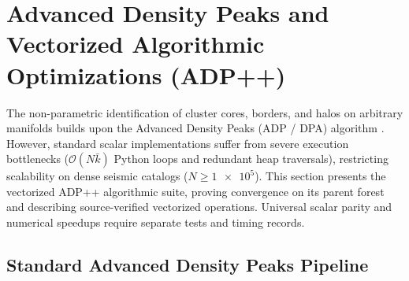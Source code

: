 \section{Advanced Density Peaks and Vectorized Algorithmic
Optimizations (ADP++)}
\label{sec:adppp_optimizations}

The non-parametric identification of cluster cores, borders, and
halos on arbitrary manifolds builds upon the Advanced Density Peaks
(\textsc{ADP} / \textsc{DPA}) algorithm
\parencite{rodriguez2014,derrico2021}. However, standard scalar
implementations suffer from severe execution bottlenecks
($\mathcal{O}(N \bar{k})$ Python loops and redundant heap
traversals), restricting scalability on dense seismic catalogs ($N
\ge \num{1e5}$). This section presents the vectorized \textsc{ADP++}
algorithmic suite, proving convergence on its parent forest and describing
source-verified vectorized operations. Universal scalar parity and
numerical speedups require separate tests and timing records.

\subsection{Standard Advanced Density Peaks Pipeline}
\label{subsec:adp_standard}

